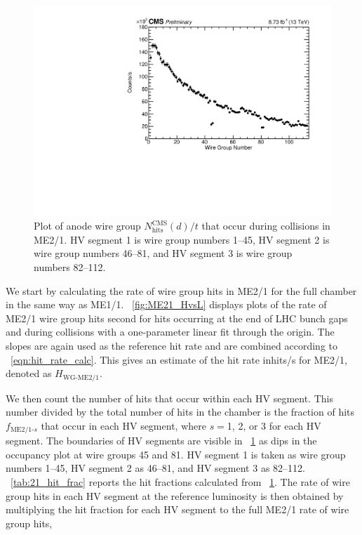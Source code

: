 \begin{figure}
	\centering
	\includegraphics[width=\dummyFigWidth]{figures/neutron/occupancy_21_wire_total_CHAM_TIME_20180416.pdf}
	\caption{Plot of anode wire group ${N}^\text{CMS}_\text{hits}(d)/{t}$ that occur during \pp collisions in ME2/1. HV segment 1 is wire group numbers 1--45, HV segment 2 is wire group numbers 46--81, and HV segment 3 is wire group numbers 82--112.}
	\label{fig:ME21_inTrain_occ}
\end{figure}

We start by calculating the rate of wire group hits in ME2/1 for the full chamber in the same way as ME1/1. \Fig~\ref{fig:ME21_HvsL} displays plots of the rate of ME2/1 wire group hits second for hits occurring at the end of LHC bunch gaps and during \pp collisions with a one-parameter linear fit through the origin. The slopes are again used as the reference hit rate and are combined according to \Eq~\ref{eqn:hit_rate_calc}. This gives an estimate of the hit rate in\unit{hits/s} for ME2/1, denoted as $H_\text{WG-ME2/1}$.

We then count the number of hits that occur within each HV segment. This number divided by the total number of hits in the chamber is the fraction of hits $f_{\text{ME2/1-}s}$ that occur in each HV segment, where $s=$1, 2, or 3 for each HV segment. The boundaries of HV segments are visible in \FigDot~\ref{fig:ME21_inTrain_occ} as dips in the occupancy plot at wire groups 45 and 81. HV segment 1 is taken as wire group numbers 1--45, HV segment 2 as 46--81, and HV segment 3 as 82--112. \Tab~\ref{tab:21_hit_frac} reports the hit fractions calculated from \FigDot~\ref{fig:ME21_inTrain_occ}. The rate of wire group hits in each HV segment at the reference luminosity is then obtained by multiplying the hit fraction for each HV segment to the full ME2/1 rate of wire group hits, 

